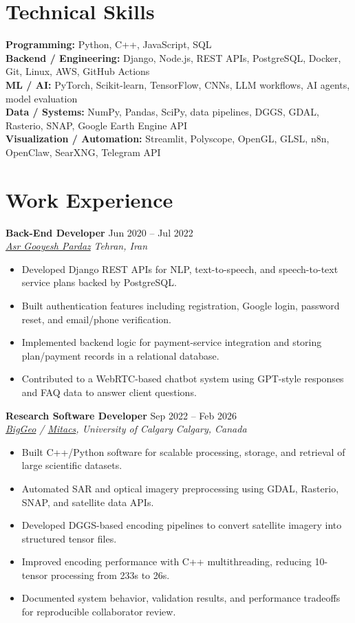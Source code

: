 \documentclass[a4paper,10pt]{article}
\newcommand{\resumeSubheading}[4]{
    \textbf{#1} \hfill #2 \\
    \textit{#3} \hfill \textit{#4}
}
\begin{document}
\section*{Technical Skills}

\textbf{Programming:} Python, C++, JavaScript, SQL \\
\textbf{Backend / Engineering:} Django, Node.js, REST APIs, PostgreSQL, Docker, Git, Linux, AWS, GitHub Actions \\
\textbf{ML / AI:} PyTorch, Scikit-learn, TensorFlow, CNNs, LLM workflows, AI agents, model evaluation \\
\textbf{Data / Systems:} NumPy, Pandas, SciPy, data pipelines, DGGS, GDAL, Rasterio, SNAP, Google Earth Engine API \\
\textbf{Visualization / Automation:} Streamlit, Polyscope, OpenGL, GLSL, n8n, OpenClaw, SearXNG, Telegram API


\section*{Work Experience}

\resumeSubheading
{Back-End Developer}
{Jun 2020 -- Jul 2022}
{\href{https://asr-gooyesh.com/en/}{Asr Gooyesh Pardaz}}
{Tehran, Iran}
\begin{itemize}[leftmargin=0.25in]
    \item Developed Django REST APIs for NLP, text-to-speech, and speech-to-text service plans backed by PostgreSQL.
    \item Built authentication features including registration, Google login, password reset, and email/phone verification.
    \item Implemented backend logic for payment-service integration and storing plan/payment records in a relational database.
    \item Contributed to a WebRTC-based chatbot system using GPT-style responses and FAQ data to answer client questions.
\end{itemize}

\resumeSubheading
{Research Software Developer}
{Sep 2022 -- Feb 2026}
{\href{https://biggeo.com}{BigGeo} / \href{https://www.mitacs.ca/}{Mitacs}, University of Calgary}
{Calgary, Canada}
\begin{itemize}[leftmargin=0.25in]
    \item Built C++/Python software for scalable processing, storage, and retrieval of large scientific datasets.
    \item Automated SAR and optical imagery preprocessing using GDAL, Rasterio, SNAP, and satellite data APIs.
    \item Developed DGGS-based encoding pipelines to convert satellite imagery into structured tensor files.
    \item Improved encoding performance with C++ multithreading, reducing 10-tensor processing from 233s to 26s.
    \item Documented system behavior, validation results, and performance tradeoffs for reproducible collaborator review.
\end{itemize}
\end{document}

